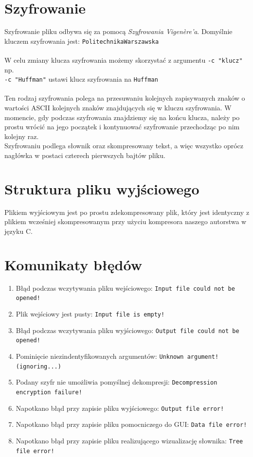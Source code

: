 \documentclass[]{article}
\begin{document}
 \section{Szyfrowanie}\label{header-n281} 
Szyfrowanie pliku odbywa się za pomocą \emph{Szyfrowania Vigenère’a}. Domyślnie kluczem szyfrowania jest: 
\texttt{Politechnika\textunderscore Warszawska} \\\\
W celu zmiany klucza szyfrowania możemy skorzystać z argumentu \texttt{-c "klucz"} np. \\
\texttt{-c "Huffman"} ustawi klucz szyfrowania na \texttt{Huffman} \\\\
Ten rodzaj szyfrowania polega na przesuwaniu kolejnych zapisywanych znaków o wartości ASCII kolejnych znaków znajdujących się w kluczu szyfrowania. W momencie, gdy podczas szyfrowania znajdziemy się na końcu klucza, należy po prostu wrócić na jego początek i kontynuować szyfrowanie przechodząc po nim kolejny raz. \\
Szyfrowaniu podlega słownik oraz skompresowany tekst, a więc wszystko oprócz nagłówka w postaci czterech pierwszych bajtów pliku.

\section{Struktura pliku wyjściowego}\label{header-n279}
Plikiem wyjściowym jest po prostu zdekompresowany plik, który jest identyczny z plikiem wcześniej skompresowanym przy użyciu kompresora naszego autorstwa w języku C.

\section{Komunikaty błędów}\label{header-n281}

\begin{enumerate}
\def\labelenumi{\arabic{enumi}.}
\item
Błąd podczas wczytywania pliku wejściowego: \texttt{Input file could not be opened!}
\item
Plik wejściowy jest pusty: \texttt{Input file is empty!}
\item
Błąd podczas wczytywania pliku wyjściowego:  \texttt{Output file could not be opened!}
\item
Pominięcie niezindentyfikowanych argumentów: \texttt{Unknown argument! (ignoring...)}
\item
Podany szyfr nie umożliwia pomyślnej dekompresji: \texttt{Decompression encryption failure!}
\item 
Napotkano błąd przy zapisie pliku wyjściowego: \texttt{Output file error!}
\item 
Napotkano błąd przy zapisie pliku pomocniczego do GUI: \texttt{Data file error!}
\item 
Napotkano błąd przy zapisie pliku realizującego wizualizację słownika: \texttt{Tree file error!}
\end{enumerate}
\end{document}
